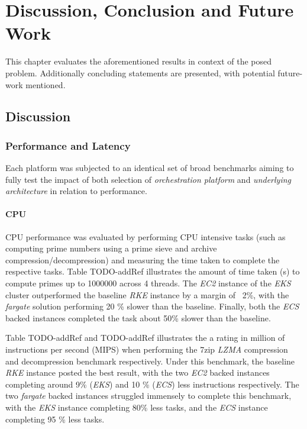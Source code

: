 \part{Discussion, Conclusion and Future Work}

This chapter evaluates the aforementioned results in context of the posed problem.
Additionally concluding statements are presented, with potential future-work mentioned.

\chapter{Discussion}

\section{Performance and Latency}
Each platform was subjected to an identical set of broad benchmarks aiming to fully test the impact of both
selection of \emph{orchestration platform} and \emph{underlying architecture} in relation to performance.

\subsection{CPU}
CPU performance was evaluated by performing CPU intensive tasks
(such as computing prime numbers using a prime sieve and archive compression/decompression)
and measuring the time taken to complete the respective tasks.
\indent Table TODO-addRef illustrates the amount of time taken (s) to compute primes up to 1000000 across 4 threads.
The \textit{EC2} instance of the \textit{EKS} cluster outperformed the baseline \textit{RKE} instance by a margin of ~2\%,
with the \textit{fargate} solution performing 20 \% slower than the baseline.
Finally, both the \textit{ECS} backed instances completed the task about 50\% slower than the baseline.

Table TODO-addRef and TODO-addRef illustrates the a rating in million of instructions per second (MIPS) when performing the 7zip \textit{LZMA} compression and decompression benchmark respectively.
Under this benchmark, the baseline \textit{RKE} instance posted the best result, with the two \textit{EC2} backed instances completing around 9\% (\textit{EKS}) and 10 \% (\textit{ECS}) less instructions respectively.
The two \textit{fargate} backed instances struggled immensely to complete this benchmark,
with the \textit{EKS} instance completing 80\% less tasks, and the \textit{ECS} instance completing 95 \% less tasks.

